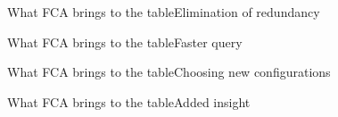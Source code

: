 \begin{frame}{What FCA brings to the table}{Elimination of redundancy}
\end{frame}

\begin{frame}{What FCA brings to the table}{Faster query}
\end{frame}

\begin{frame}{What FCA brings to the table}{Choosing new configurations}
\end{frame}

\begin{frame}{What FCA brings to the table}{Added insight}
\end{frame}